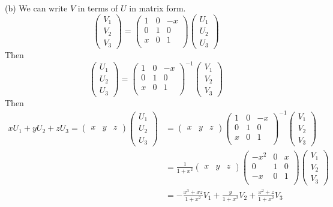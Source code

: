 \documentclass[12pt]{article}
\begin{document}
(b) We can write $V$ in terms of $U$ in matrix form.
$$
 \begin{pmatrix}
 	V_1 \\  V_2  \\  V_3
 \end{pmatrix}
=
\begin{pmatrix}
	1 & 0 & -x \\
	0 & 1 & 0 \\
	x & 0 & 1  \\
\end{pmatrix}
\begin{pmatrix}
	U_1 \\  U_2  \\  U_3
\end{pmatrix}
$$
Then $$
 \begin{pmatrix}
	U_1 \\  U_2  \\  U_3
\end{pmatrix}
=
\begin{pmatrix}
	1 & 0 & -x \\
	0 & 1 & 0 \\
	x & 0 & 1  \\
\end{pmatrix}^{-1}
\begin{pmatrix}
	V_1 \\  V_2  \\  V_3
\end{pmatrix}
$$
Then 
$$
\begin{aligned}
xU_1 + yU_2 + zU_3 = \begin{pmatrix}
	x & y & z
\end{pmatrix}
\begin{pmatrix}
	U_1 \\ U_2 \\ U_3
\end{pmatrix}
&= \begin{pmatrix}
	x & y & z
\end{pmatrix} 
\begin{pmatrix}
	1 & 0 & -x \\
	0 & 1 & 0 \\
	x & 0 & 1  \\
\end{pmatrix}^{-1}
\begin{pmatrix}
	V_1 \\  V_2  \\  V_3
\end{pmatrix}  \\
&= \frac{1}{1+x^2} \begin{pmatrix}
	x & y & z
\end{pmatrix} 
\begin{pmatrix}
	-x^2 & 0 & x \\
	0 & 1 & 0 \\
	-x & 0 & 1  \\
\end{pmatrix}
\begin{pmatrix}
	V_1 \\  V_2  \\  V_3
\end{pmatrix}  \\
&= -\frac{x^3 + xz}{1+x^2} V_1+\frac{y}{1+x^2} V_2 + \frac{x^2+z}{1+x^2}V_3
\end{aligned}
$$
\end{document}
